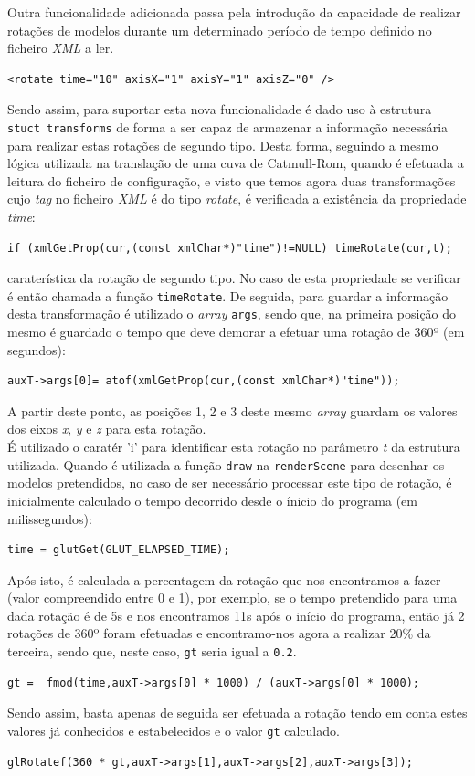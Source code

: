 \documentclass{article}
\begin{document}
Outra funcionalidade adicionada passa pela introdução da capacidade de realizar rotações de modelos durante um determinado período de tempo definido no ficheiro \textit{XML} a ler.
\begin{verbatim}
<rotate time="10" axisX="1" axisY="1" axisZ="0" />
\end{verbatim}
Sendo assim, para suportar esta nova funcionalidade é dado uso à estrutura \texttt{stuct transforms} de forma a ser capaz de armazenar a informação necessária para realizar estas rotações de segundo tipo. Desta forma, seguindo a mesmo lógica utilizada na translação de uma cuva de Catmull-Rom, quando é efetuada a leitura do ficheiro de configuração, e visto que temos agora duas transformações cujo \textit{tag} no ficheiro \textit{XML} é do tipo \textit{rotate}, é verificada a existência da propriedade \textit{time}:
\begin{verbatim}
if (xmlGetProp(cur,(const xmlChar*)"time")!=NULL) timeRotate(cur,t);
\end{verbatim}
caraterística da rotação de segundo tipo. No caso de esta propriedade se verificar é então chamada a função \texttt{timeRotate}. De seguida, para guardar a informação desta transformação é utilizado o \textit{array} \texttt{args}, sendo que, na primeira posição do mesmo é guardado o tempo que deve demorar a efetuar uma rotação de 360º (em segundos):
\begin{verbatim}
auxT->args[0]= atof(xmlGetProp(cur,(const xmlChar*)"time"));
\end{verbatim}
A partir deste ponto, as posições 1, 2 e 3 deste mesmo \textit{array} guardam os valores dos eixos \textit{x}, \textit{y} e \textit{z} para esta rotação.\\
É utilizado o caratér 'i' para identificar esta rotação no parâmetro \textit{t} da estrutura utilizada.
\newline
Quando é utilizada a função \texttt{draw} na \texttt{renderScene} para desenhar os modelos pretendidos, no caso de ser necessário processar este tipo de rotação, é inicialmente calculado o tempo decorrido desde o ínicio do programa (em milissegundos):
\begin{verbatim}
time = glutGet(GLUT_ELAPSED_TIME);
\end{verbatim}
Após isto, é calculada a percentagem da rotação que nos encontramos a fazer (valor compreendido entre 0 e 1), por exemplo, se o tempo pretendido para uma dada rotação 
é de 5s e nos encontramos 11s após o início do programa, então já 2 rotações de 360º foram efetuadas e encontramo-nos agora a realizar 20\% da terceira, sendo que, neste caso, \texttt{gt} seria igual a \texttt{0.2}.
\begin{verbatim}
gt =  fmod(time,auxT->args[0] * 1000) / (auxT->args[0] * 1000);
\end{verbatim}
Sendo assim, basta apenas de seguida ser efetuada a rotação tendo em conta estes valores já conhecidos e estabelecidos e o valor \texttt{gt} calculado.
\begin{verbatim}
glRotatef(360 * gt,auxT->args[1],auxT->args[2],auxT->args[3]);
\end{verbatim}
\end{document}
